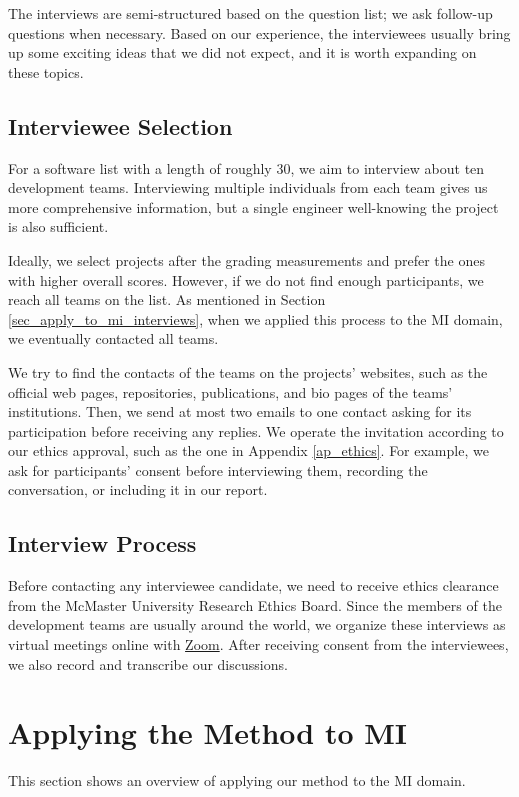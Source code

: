 The interviews are semi-structured based on the question list; we ask follow-up questions when necessary. Based on our experience, the interviewees usually bring up some exciting ideas that we did not expect, and it is worth expanding on these topics.

\subsection{Interviewee Selection}
\label{sec_interviewee_selection}
For a software list with a length of roughly 30, we aim to interview about ten development teams. Interviewing multiple individuals from each team gives us more comprehensive information, but a single engineer well-knowing the project is also sufficient.

Ideally, we select projects after the grading measurements and prefer the ones with higher overall scores. However, if we do not find enough participants, we reach all teams on the list. As mentioned in Section  \ref{sec_apply_to_mi_interviews}, when we applied this process to the MI domain, we eventually contacted all teams.

We try to find the contacts of the teams on the projects' websites, such as the official web pages, repositories, publications, and bio pages of the teams' institutions. Then, we send at most two emails to one contact asking for its participation before receiving any replies. We operate the invitation according to our ethics approval, such as the one in Appendix \ref{ap_ethics}. For example, we ask for participants' consent before interviewing them, recording the conversation, or including it in our report.

\subsection{Interview Process}
\label{sec_interview_process}
Before contacting any interviewee candidate, we need to receive ethics clearance from the McMaster University Research Ethics Board. Since the members of the development teams are usually around the world, we organize these interviews as virtual meetings online with \hyperlink{https://zoom.us/}{Zoom}. After receiving consent from the interviewees, we also record and transcribe our discussions.

\section{Applying the Method to MI}
\label{sec_applying_method}
This section shows an overview of applying our method to the MI domain.


